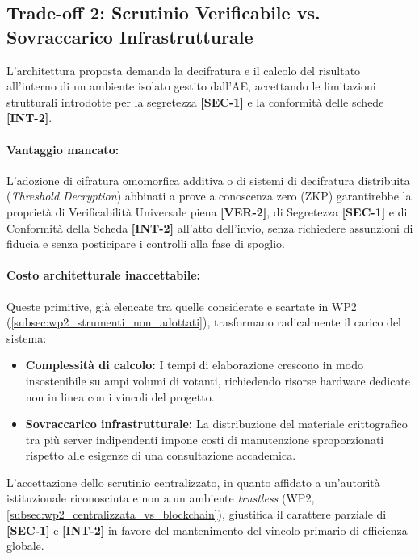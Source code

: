 \subsection{Trade-off 2: Scrutinio Verificabile vs. Sovraccarico Infrastrutturale}
\label{subsec:3.4.2_tradeoff_scrutinio}

L'architettura proposta demanda la decifratura e il calcolo del risultato all'interno di un ambiente isolato gestito dall'AE, accettando le limitazioni strutturali introdotte per la segretezza \textbf{[SEC-1]} e la conformità delle schede \textbf{[INT-2]}.

\paragraph{Vantaggio mancato:} L'adozione di cifratura omomorfica additiva o di sistemi di decifratura distribuita (\textit{Threshold Decryption}) abbinati a prove a conoscenza zero (ZKP) garantirebbe la proprietà di Verificabilità Universale piena \textbf{[VER-2]}, di Segretezza \textbf{[SEC-1]} e di Conformità della Scheda \textbf{[INT-2]} all'atto dell'invio, senza richiedere assunzioni di fiducia e senza posticipare i controlli alla fase di spoglio.

\paragraph{Costo architetturale inaccettabile:} Queste primitive, già elencate tra quelle considerate e scartate in WP2 (\ref{subsec:wp2_strumenti_non_adottati}), trasformano radicalmente il carico del sistema:
\begin{itemize}
    \item \textbf{Complessità di calcolo:} I tempi di elaborazione crescono in modo insostenibile su ampi volumi di votanti, richiedendo risorse hardware dedicate non in linea con i vincoli del progetto.
    \item \textbf{Sovraccarico infrastrutturale:} La distribuzione del materiale crittografico tra più server indipendenti impone costi di manutenzione sproporzionati rispetto alle esigenze di una consultazione accademica.
\end{itemize}
L'accettazione dello scrutinio centralizzato, in quanto affidato a un'autorità istituzionale riconosciuta e non a un ambiente \textit{trustless} (WP2, \ref{subsec:wp2_centralizzata_vs_blockchain}), giustifica il carattere parziale di \textbf{[SEC-1]} e \textbf{[INT-2]} in favore del mantenimento del vincolo primario di efficienza globale.

